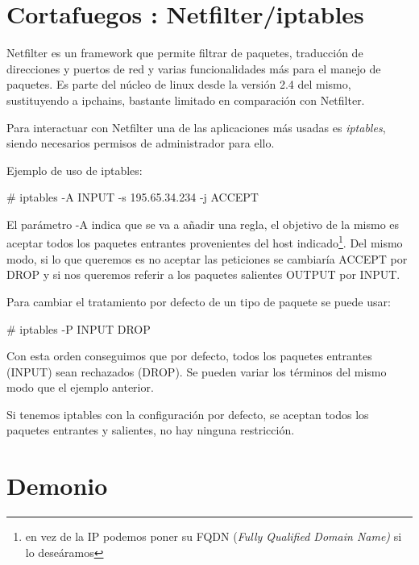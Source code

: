 \section{Cortafuegos : Netfilter/iptables}
\label{sec:introduction:iptables}

Netfilter es un framework que permite filtrar de paquetes, traducci\'on de direcciones y puertos de red y varias funcionalidades m\'as para el manejo de paquetes. Es parte del n\'ucleo de linux desde la versi\'on 2.4 del mismo, sustituyendo a ipchains, bastante limitado en comparaci\'on con Netfilter.
\newline


Para interactuar con Netfilter una de las aplicaciones más usadas es \emph{iptables}\cite{iptables:2004}, siendo necesarios permisos de administrador para ello.
\newline

Ejemplo de uso de iptables:

\begin{center}
    \# iptables -A INPUT -s 195.65.34.234 -j ACCEPT\\
\end{center}


El par\'ametro -A indica que se va a a\~nadir una regla, el objetivo de la mismo es aceptar todos los paquetes entrantes provenientes del host indicado\footnote{en vez de la IP podemos poner su FQDN (\emph{Fully Qualified Domain Name)} si lo deseáramos}. Del mismo modo, si lo que queremos es no aceptar las peticiones se cambiar\'ia ACCEPT por DROP y si nos queremos referir a los paquetes salientes OUTPUT por INPUT.
\newline

Para cambiar el tratamiento por defecto de un tipo de paquete se puede usar:

\begin{center}
    \# iptables -P INPUT DROP\\
\end{center}

Con esta orden conseguimos que por defecto, todos los paquetes entrantes (INPUT) sean rechazados (DROP). Se pueden variar los términos del mismo modo que el ejemplo anterior.
\newline


Si tenemos iptables con la configuración por defecto, se aceptan todos los paquetes entrantes y salientes, no hay ninguna restricción.




\section{Demonio}

